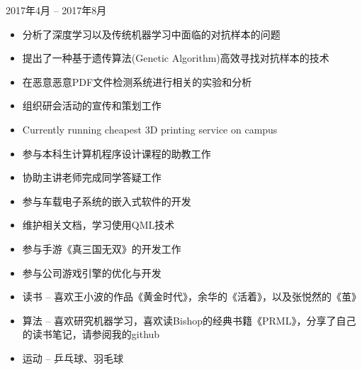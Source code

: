 ﻿\documentclass{resume}
\begin{document}
 {2017年4月 -- 2017年8月}
\begin{itemize}
	\item 分析了深度学习以及传统机器学习中面临的对抗样本的问题
	\item 提出了一种基于遗传算法(Genetic Algorithm)高效寻找对抗样本的技术
    \item 在恶意恶意PDF文件检测系统进行相关的实验和分析
\end{itemize}

\StudentTeams
{}
\begin{itemize}
	\item 组织研会活动的宣传和策划工作
	\item Currently running cheapest 3D printing service on campus
\end{itemize}

\begin{itemize}
    \item 参与本科生计算机程序设计课程的助教工作
    \item 协助主讲老师完成同学答疑工作
\end{itemize}

\OtherWorkExperience

\begin{itemize}
	\item 参与车载电子系统的嵌入式软件的开发
	\item 维护相关文档，学习使用QML技术
\end{itemize}

\begin{itemize}
	\item 参与手游《真三国无双》的开发工作
	\item 参与公司游戏引擎的优化与开发
\end{itemize}


\Intrests

\begin{itemize}
	\item 读书 -- 喜欢王小波的作品《黄金时代》，余华的《活着》，以及张悦然的《茧》
	\item 算法 -- 喜欢研究机器学习，喜欢读Bishop的经典书籍《PRML》，分享了自己的读书笔记，请参阅我的github
    \item 运动 -- 乒乓球、羽毛球
\end{itemize}
\end{document}
